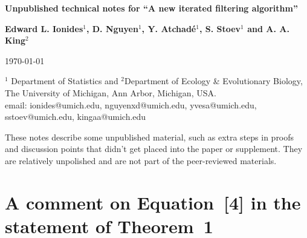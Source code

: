 \documentclass[11pt]{article}
\begin{document}
\begin{center}
{\bf \Large 
Unpublished technical notes for ``A new iterated filtering algorithm''
}
\end{center}
\bigskip
\begin{center}
\textbf{Edward L. Ionides$^1$, D. Nguyen$^1$, Y. Atchad\'{e}$^1$, S. Stoev$^1$ and A. A. King$^2$}
 
\vspace{3mm}
\today
\vspace{3mm}

{\small 
$^1$ Department of Statistics and $^2$Department of Ecology \& Evolutionary Biology,\\
The University of Michigan, Ann Arbor, Michigan, USA.  \\
email: ionides@umich.edu, nguyenxd@umich.edu, yvesa@umich.edu, sstoev@umich.edu, kingaa@umich.edu

\medskip

}

\vspace{2cm}

\parbox{5in}{These notes describe some unpublished material, such as extra steps in proofs and discussion points that didn't get placed into the paper or supplement. 
They are relatively unpolished and are not part of the peer-reviewed materials.
}
\end{center}


\vspace{2cm}


\tableofcontents

\newpage

\section{A comment on Equation~[4] in the statement of Theorem~1}
\end{document}

